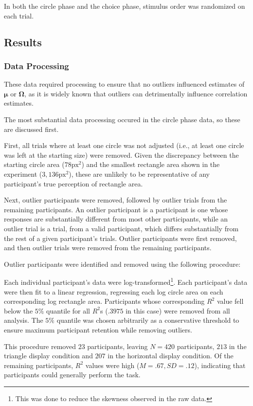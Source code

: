 In both the circle phase and the choice phase, stimulus order was randomized on each trial.

\subsection{Results}
\subsubsection{Data Processing}

These data required processing to ensure that no outliers influenced estimates of $\boldsymbol{\mu}$ or $\mathbf{\Omega}$, as it is widely known that outliers can detrimentally influence correlation estimates. 

The most substantial data processing occured in the circle phase data, so these are discussed first.

First, all trials where at least one circle was not adjusted (i.e.,
at least one circle was left at the starting size) were removed. Given the discrepancy between the starting circle area ($78\text{px}^2$) and the smallest rectangle area shown in the experiment ($3,136\text{px}^2$), these are unlikely to be representative of any participant's true perception of rectangle area.

Next, outlier participants were removed, followed by outlier trials from the remaining participants. An outlier participant is a participant is one whose responses are substantially different from most other participants, while an outlier trial is a trial, from a valid participant, which differs substantially from the rest of a given participant's trials. Outlier participants were first removed, and then outlier trials were removed from the remaining participants.

Outlier participants were identified and removed using the following procedure:

Each individual participant's data were log-transformed\footnote{This was done to reduce the skewness observed in the raw data.}. Each participant's data were then fit to a linear regression, regressing each log circle area on each corresponding log rectangle area. Participants whose corresponding $R^2$ value fell below the $5\%$ quantile for all $R^2$s ($.3975$ in this case) were removed from all analysis. The $5\%$ quantile was chosen arbitrarily as a conservative threshold to ensure maximum participant retention while removing outliers. 

This procedure removed $23$ participants, leaving $N=420$ participants, $213$ in the triangle display condition and $207$ in the horizontal display condition. Of the remaining participants, $R^2$ values were high ($M=.67,SD=.12$), indicating that participants could generally perform the task.

